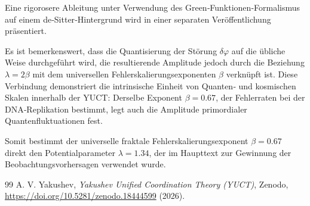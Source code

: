 \documentclass[12pt]{article}
\theoremstyle{remark}
\begin{document}
	Eine rigorosere Ableitung unter Verwendung des Green‑Funktionen‑Formalismus auf einem de‑Sitter‑Hintergrund wird in einer separaten Veröffentlichung präsentiert.
	
	Es ist bemerkenswert, dass die Quantisierung der Störung $\delta\varphi$ auf die übliche Weise durchgeführt wird, die resultierende Amplitude jedoch durch die Beziehung $\lambda = 2\beta$ mit dem universellen Fehlerskalierungsexponenten $\beta$ verknüpft ist. Diese Verbindung demonstriert die intrinsische Einheit von Quanten‑ und kosmischen Skalen innerhalb der YUCT: Derselbe Exponent $\beta = 0.67$, der Fehlerraten bei der DNA‑Replikation bestimmt, legt auch die Amplitude primordialer Quantenfluktuationen fest.
	
	Somit bestimmt der universelle fraktale Fehlerskalierungsexponent $\beta = 0.67$ direkt den Potentialparameter $\lambda = 1.34$, der im Haupttext zur Gewinnung der Beobachtungsvorhersagen verwendet wurde.
	
	\begin{thebibliography}{99}
		A. V. Yakushev, \emph{Yakushev Unified Coordination Theory (YUCT)}, Zenodo, \url{https://doi.org/10.5281/zenodo.18444599} (2026).
	\end{thebibliography}
	
\end{document}
